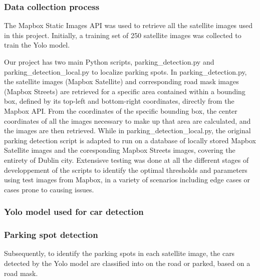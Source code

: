 \subsubsection{Data collection process}
The Mapbox Static Images API was used to retrieve all the satellite images used in this project.
Initially, a training set of 250 satellite images was collected to train the Yolo model.

Our project has two main Python scripts, parking_detection.py and parking_detection_local.py to localize parking spots.
In parking_detection.py, the satellite images (Mapbox Satellite) and corresponding road mask images (Mapbox Streets) are retrieved for a specific area contained within a bounding box, defined by its top-left and bottom-right coordinates, directly from the Mapbox API.
From the coordinates of the specific bounding box, the center coordinates of all the images necessary to make up that area are calculated, and the images are then retrieved.
While in parking_detection_local.py, the original parking detection script is adapted to run on a database of locally stored Mapbox Satellite images and the coresponding Mapbox Streets images, covering the entirety of Dublin city.
Extensisve testing was done at all the different stages of developpement of the scripts to identify the optimal thresholds and parameters using test images from Mapbox, in a variety of scenarios including edge cases or cases prone to causing issues.

\subsubsection{Yolo model used for car detection}


\subsubsection{Parking spot detection}
Subsequently, to identify the parking spots in each satellite image, the cars detected by the Yolo model are classified into on the road or parked, based on a road mask.

